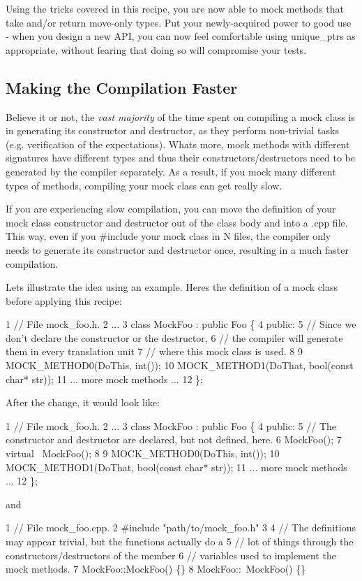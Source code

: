 Using the tricks covered in this recipe, you are now able to mock methods that take and/or return move-\/only types. Put your newly-\/acquired power to good use -\/ when you design a new A\+PI, you can now feel comfortable using {\ttfamily unique\+\_\+ptrs} as appropriate, without fearing that doing so will compromise your tests.

\subsection*{Making the Compilation Faster}

Believe it or not, the {\itshape vast majority} of the time spent on compiling a mock class is in generating its constructor and destructor, as they perform non-\/trivial tasks (e.\+g. verification of the expectations). What\textquotesingle{}s more, mock methods with different signatures have different types and thus their constructors/destructors need to be generated by the compiler separately. As a result, if you mock many different types of methods, compiling your mock class can get really slow.

If you are experiencing slow compilation, you can move the definition of your mock class\textquotesingle{} constructor and destructor out of the class body and into a {\ttfamily .cpp} file. This way, even if you {\ttfamily \#include} your mock class in N files, the compiler only needs to generate its constructor and destructor once, resulting in a much faster compilation.

Let\textquotesingle{}s illustrate the idea using an example. Here\textquotesingle{}s the definition of a mock class before applying this recipe\+:


\begin{DoxyCode}
1 // File mock\_foo.h.
2 ...
3 class MockFoo : public Foo \{
4  public:
5   // Since we don't declare the constructor or the destructor,
6   // the compiler will generate them in every translation unit
7   // where this mock class is used.
8 
9   MOCK\_METHOD0(DoThis, int());
10   MOCK\_METHOD1(DoThat, bool(const char* str));
11   ... more mock methods ...
12 \};
\end{DoxyCode}


After the change, it would look like\+:


\begin{DoxyCode}
1 // File mock\_foo.h.
2 ...
3 class MockFoo : public Foo \{
4  public:
5   // The constructor and destructor are declared, but not defined, here.
6   MockFoo();
7   virtual ~MockFoo();
8 
9   MOCK\_METHOD0(DoThis, int());
10   MOCK\_METHOD1(DoThat, bool(const char* str));
11   ... more mock methods ...
12 \};
\end{DoxyCode}
 and 
\begin{DoxyCode}
1 // File mock\_foo.cpp.
2 #include "path/to/mock\_foo.h"
3 
4 // The definitions may appear trivial, but the functions actually do a
5 // lot of things through the constructors/destructors of the member
6 // variables used to implement the mock methods.
7 MockFoo::MockFoo() \{\}
8 MockFoo::~MockFoo() \{\}
\end{DoxyCode}


